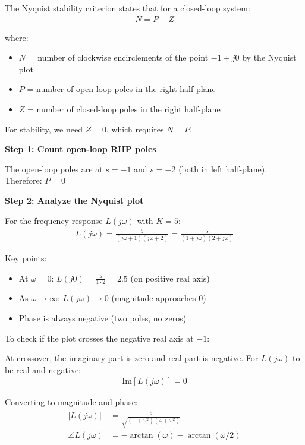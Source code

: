 \documentclass[11pt,a4paper]{article}
\begin{document}
The Nyquist stability criterion states that for a closed-loop system:
\begin{align}
N = P - Z
\end{align}

where:
\begin{itemize}
\item $N$ = number of clockwise encirclements of the point $-1 + j0$ by the Nyquist plot
\item $P$ = number of open-loop poles in the right half-plane
\item $Z$ = number of closed-loop poles in the right half-plane
\end{itemize}

For stability, we need $Z = 0$, which requires $N = P$.

\textbf{Step 1: Count open-loop RHP poles}

The open-loop poles are at $s = -1$ and $s = -2$ (both in left half-plane).
Therefore: $P = 0$

\textbf{Step 2: Analyze the Nyquist plot}

For the frequency response $L(j\omega)$ with $K = 5$:
\begin{align}
L(j\omega) = \frac{5}{(j\omega+1)(j\omega+2)} = \frac{5}{(1+j\omega)(2+j\omega)}
\end{align}

Key points:
\begin{itemize}
\item At $\omega = 0$: $L(j0) = \frac{5}{1 \cdot 2} = 2.5$ (on positive real axis)
\item As $\omega \to \infty$: $L(j\omega) \to 0$ (magnitude approaches 0)
\item Phase is always negative (two poles, no zeros)
\end{itemize}

To check if the plot crosses the negative real axis at $-1$:

At crossover, the imaginary part is zero and real part is negative. For $L(j\omega)$ to be real and negative:
\begin{align}
\text{Im}[L(j\omega)] = 0
\end{align}

Converting to magnitude and phase:
\begin{align}
|L(j\omega)| &= \frac{5}{\sqrt{(1+\omega^2)(4+\omega^2)}} \\
\angle L(j\omega) &= -\arctan(\omega) - \arctan(\omega/2)
\end{align}
\end{document}
